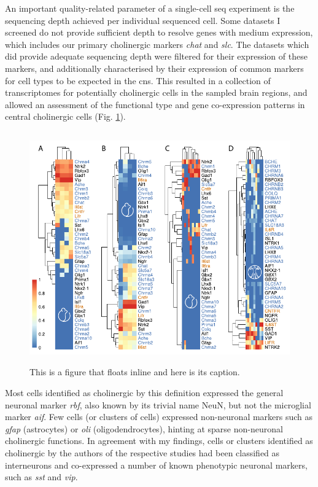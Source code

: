 An important quality-related parameter of a single-cell \ac{seq} experiment is the sequencing depth achieved per individual sequenced cell. Some datasets I screened do not provide sufficient depth to resolve genes with medium expression, which includes our primary cholinergic markers \textit{\ac{chat}} and \textit{\ac{slc}}. The datasets which did provide adequate sequencing depth were filtered for their expression of these markers, and additionally characterised by their expression of common markers for cell types to be expected in the \ac{cns}. This resulted in a collection of transcriptomes for potentially cholinergic cells in the sampled brain regions, and allowed an assessment of the functional type and gene co-expression patterns in central cholinergic cells (Fig. \ref{fig:singlecell}).

\begin{figure}
\centering
\includegraphics[height=10cm]{figures/singlecell}
\caption[Short figure name.]{This is a figure that floats inline and here is its caption.
\label{fig:singlecell}}
\end{figure}

Most cells identified as cholinergic by this definition expressed the general neuronal marker \textit{\acs{rbf}}, also known by its trivial name NeuN, but not the microglial marker \textit{\acs{aif}}. Few cells (or clusters of cells) expressed non-neuronal markers such as \textit{\acs{gfap}} (astrocytes) or \textit{\acs{oli}} (oligodendrocytes), hinting at sparse non-neuronal cholinergic functions. In agreement with my findings, cells or clusters identified as cholinergic by the authors of the respective studies had been classified as interneurons and co-expressed a number of known phenotypic neuronal markers, such as \textit{\ac{sst}} and \textit{\ac{vip}}.

